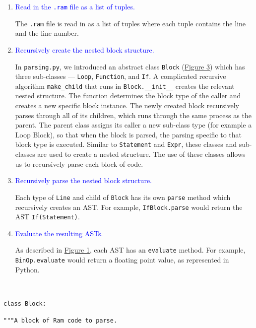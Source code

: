 \documentclass[fontsize=11pt]{article}
\newcommand{\blue}[1]{\textcolor{blue}{#1}}
\begin{document}
\begin{enumerate}
    \item \blue{Read in the \texttt{.ram} file as a list of tuples.}
    
    The \texttt{.ram} file is read in as a list of tuples where each tuple contains the line and the line number. 
    
    \item \blue{Recursively create the nested block structure.}
    
    In \texttt{parsing.py}, we introduced an abstract class \texttt{Block} (\hyperlink{fig3}{Figure 3}) which has three sub-classes --- \texttt{Loop}, \texttt{Function}, and \texttt{If}. A complicated recursive algorithm \texttt{make\_child} that runs in \texttt{Block.\_\_init\_\_} creates the relevant nested structure. The function determines the block type of the caller and creates a new specific block instance. The newly created block recursively parses through all of its children, which runs through the same process as the parent. The parent class assigns its caller a new sub-class type (for example a Loop Block), so that when the block is parsed, the parsing specific to that block type is executed. Similar to \texttt{Statement} and \texttt{Expr}, these classes and sub-classes are used to create a nested structure. The use of these classes allows us to recursively parse each block of code. 
    
    \item \blue{Recursively parse the nested block structure.}
    
     Each type of \texttt{Line} and child of \texttt{Block} has its own \texttt{parse} method which recursively creates an AST. For example, \texttt{IfBlock.parse} would return the AST \texttt{If(Statement)}.
    
    \item \blue{Evaluate the resulting ASTs.}
    
    As described in \hyperlink{fig1}{Figure 1}, each AST has an \texttt{evaluate} method. For example, \texttt{BinOp.evaluate} would return a floating point value, as represented in Python.
    
\end{enumerate}

$ $

\hypertarget{fig3}{}

\texttt{\textcolor{keywordred}{class} \textcolor{keywordorange}{Block}:}

\quad\quad \texttt{\textcolor{commentblue}{"""A block of Ram code to parse.}}
\end{document}
